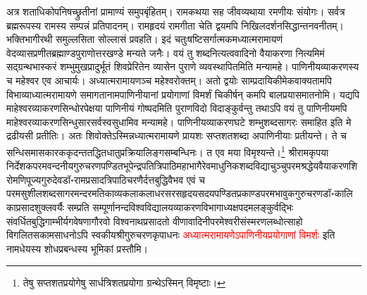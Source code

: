 \begin{sloppypar}\justifying\noindent\hspace{10mm} अत्र शताधिकोपनिषच्छ्रुतीनां प्रामाण्यं समुपबृंहितम्। राम\-कथया सह जीव\-व्यथाया रमणीयः संयोगः। सर्वत्र ब्रह्म\-रूपस्य रामस्य सम्पन्नं प्रतिपादनम्। राम\-हृदयं राम\-गीता चेति द्वयमपि निखिल\-दर्शन\-सिद्धान्त\-नवनीतम्। भक्ति\-भागीरथी समुल्लसिता सोल्लासं प्रवहति। इदं चतुःषष्टि\-सर्गात्मकमध्यात्म\-रामायणं वेद\-व्यास\-प्रणीत\-ब्रह्माण्ड\-पुराणोत्तर\-खण्डे मन्यते जनैः। वयं तु शब्द\-नित्यत्व\-वादिनो वैयाकरणा नित्यमिमं सद्ग्रन्थ\-भास्करं शम्भु\-मुख\-प्रादुर्भूतं शिव\-प्रेरितेन व्यासेन पुराणे व्यवस्थापितमिति मन्यामहे। पाणिनीय\-व्याकरणस्य च महेश्वर एव आचार्यः। अध्यात्म\-रामायणञ्च महेश्वरोक्तम्। अतो द्वयोः साम्प्रदायिकीमेक\-वाक्यतामपि विभाव्याध्यात्म\-रामायणे समागतानामपाणिनीयानां प्रयोगाणां विमर्शं चिकीर्षन् कमपि बाल\-प्रयासमातनोमि। यद्यपि माहेश्वर\-व्याकरण\-सिन्धोरपेक्षया पाणिनीयं गोष्पदमिति पुराण\-विदो विदाङ्कुर्वन्तु तथाऽपि वयं तु पाणिनीयमपि माहेश्वर\-व्याकरण\-सिन्धु\-सार\-सर्वस्व\-सुधामिव मन्यामहे। पाणिनीय\-व्याकरण\-घटे शम्भु\-शब्द\-सागरः समाहित इति मे द्रढीयसी प्रतीतिः। अतः शिवोक्तेऽस्मिन्नध्यात्म\-रामायणे प्रायशः सप्त\-शत\-शब्दा अपाणिनीयाः प्रतीयन्ते। ते च सन्धि\-समास\-कारक\-कृदन्त\-तद्धित\-धातु\-प्रक्रिया\-लिङ्ग\-सम्बन्धिनः। त एव मया विमृश्यन्ते।\footnote{तेषु सप्त\-शत\-प्रयोगेषु सार्ध\-त्रिशत\-प्रयोगा ग्रन्थेऽस्मिन् विमृष्टाः।} श्रीराम\-कृपया निर्देशक\-परम\-वन्दनीय\-गुरु\-चरण\-पण्डित\-भूपेन्द्रपति\-त्रिपाठि\-महाभागैरेवमाधुनिक\-शब्द\-विद्या\-चुञ्चु\-परम\-श्रद्धेय\-वैयाकरण\-शिरोमणि\-पूज्य\-गुरुदेव\-डॉ॰\-राम\-प्रसाद\-त्रिपाठि\-चरणैर्दत्त\-बुद्धि\-वैभव एवं च परम\-सुशील\-शब्द\-सागर\-मन्दर\-मति\-काव्य\-कला\-कलाधर\-सरस\-हृदय\-सदय\-पण्डित\-प्रकाण्ड\-परम\-भावुक\-गुरु\-चरण\-डॉ॰\-कालिका\-प्रसाद\-शुक्ल\-वर्यैः सम्प्रति सम्पूर्णानन्द\-विश्व\-विद्यालय\-व्याकरण\-विभागाध्यक्ष\-पदमलङ्कुर्वद्भिः संवर्धित\-बुद्धि\-गाम्भीर्य\-गवेषणा\-गौरवो विश्वनाथ\-प्रसादतो वीणा\-वादिनी\-परमेश्वरी\-संस्मरण\-लब्धोत्साहो विगलित\-सकाम\-साधनोऽपि स्वकीय\-श्रीगुरु\-चरण\-कृपा\-धनः \textcolor{red}{अध्यात्म\-रामायणेऽपाणिनीय\-प्रयोगाणां विमर्शः} इति नामधेयस्य शोध\-प्रबन्धस्य भूमिकां प्रस्तौमि।\end{sloppypar}
